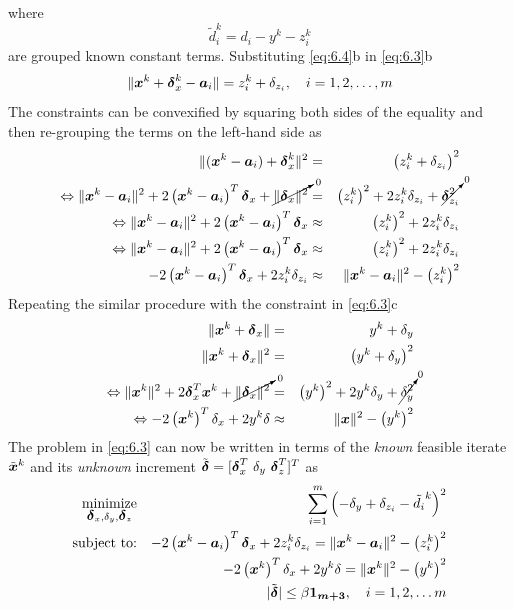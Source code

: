 where 
\begin{equation}
\nonumber
\tilde{d}^k_i =  d_i - y^k - z_i^k
\end{equation}
 are grouped known constant terms.
Substituting \ref{eq:6.4}b in \ref{eq:6.3}b
\begin{equation}
\nonumber
\|\mbox{\boldmath$x$}^k + \mbox{\boldmath${\delta}$}^k_x - \mbox{\boldmath$a$}_i\| = z^k_i +\delta_{z_i}, \quad i = 1, 2, \ldots, m
\end{equation}
The constraints can be convexified by squaring both sides of the equality and then re-grouping the terms on the left-hand side as
\begin{eqnarray}
\nonumber
\|(\mbox{\boldmath$x$}^k  - \mbox{\boldmath$a$}_i) + \mbox{\boldmath${\delta}$}^k_x\|^2 & = & \left(z^k_i +\delta_{z_i}\right)^2 \\
\nonumber
\Leftrightarrow 
\|\mbox{\boldmath$x$}^k  - \mbox{\boldmath$a$}_i\|^2 + 2\left( \mbox{\boldmath$x$}^k  - \mbox{\boldmath$a$}_i \right)^T\mbox{\boldmath${\delta}$}_x + \cancelto{\mbox{\scriptsize{0}}}{\|\mbox{\boldmath${\delta}$}_x\|^2}  & = & \left(z_i^k\right)^2 + 2z_i^k\delta_{z_i} + \cancelto{\mbox{\scriptsize{0}}}{\mbox{\boldmath${\delta}$}^2_{z_i}} \\
\nonumber
\Leftrightarrow \|\mbox{\boldmath$x$}^k  - \mbox{\boldmath$a$}_i\|^2 + 2\left( \mbox{\boldmath$x$}^k  - \mbox{\boldmath$a$}_i \right)^T\mbox{\boldmath${\delta}$}_x   & \approx & \left(z_i^k\right)^2 + 2z_i^k\delta_{z_i} \\
\nonumber
\Leftrightarrow \|\mbox{\boldmath$x$}^k  - \mbox{\boldmath$a$}_i\|^2 + 2\left( \mbox{\boldmath$x$}^k  - \mbox{\boldmath$a$}_i \right)^T\mbox{\boldmath${\delta}$}_x   & \approx & \left(z_i^k\right)^2 + 2z_i^k\delta_{z_i} \\
\nonumber
- 2\left( \mbox{\boldmath$x$}^k  - \mbox{\boldmath$a$}_i \right)^T\mbox{\boldmath${\delta}$}_x + 2z_i^k\delta_{z_i}  & \approx & \|\mbox{\boldmath$x$}^k  - \mbox{\boldmath$a$}_i\|^2 - \left(z_i^k\right)^2
\end{eqnarray}
Repeating the similar procedure with the constraint in \ref{eq:6.3}c
\begin{eqnarray}
\nonumber
\|\mbox{\boldmath$x$}^k + \mbox{\boldmath${\delta}$}_x\| & = & y^k + \delta_y \\
\nonumber
\|\mbox{\boldmath$x$}^k + \mbox{\boldmath${\delta}$}_x\|^2 & = & \left(y^k + \delta_y \right)^2 \\
\nonumber
\Leftrightarrow \|\mbox{\boldmath$x$}^k\|^2 + 2\mbox{\boldmath${\delta}$}_x^T\mbox{\boldmath$x$}^k + \cancelto{\mbox{\scriptsize{0}}}{\|\mbox{\boldmath${\delta}$}_x\|^2} & = & \left(y^k\right)^2 + 2y^k\delta_y +  \cancelto{\mbox{\scriptsize{0}}}{\delta_y^2} \\
\nonumber
\Leftrightarrow -2\left(\mbox{\boldmath$x$}^k\right)^T\delta_x + 2y^k\delta & \approx & \|\mbox{\boldmath$x$}\|^2 - \left(y^k\right)^2
\end{eqnarray}
The problem in \ref{eq:6.3} can now be written in terms of the \textit{known} feasible  iterate $\tilde{\mbox{\boldmath$x$}}^k$ and its \textit{unknown} increment  $\tilde{\mbox{\boldmath${\delta}$}} = [\mbox{\boldmath${\delta}$}_x^T \  \delta_y \ \mbox{\boldmath${\delta}$}_{z}^T]^T$ as
\begin{eqnarray} \label{eq:6.6}
\mathop{\mbox{minimize}}_{\mbox{\boldmath${\delta}$}_x, \delta_y, \mbox{\boldmath${\delta}$}_z}& &\sum^m_{i=1}\left( -\delta_y + \delta_{z_i} -\tilde{d_i}^k\right)^2\\
\nonumber
\mbox{subject to:}& &- 2\left( \mbox{\boldmath$x$}^k  - \mbox{\boldmath$a$}_i \right)^T\mbox{\boldmath${\delta}$}_x + 2z_i^k\delta_{z_i}  = \|\mbox{\boldmath$x$}^k  - \mbox{\boldmath$a$}_i\|^2 - \left(z_i^k\right)^2 \\
\nonumber
& &-2\left(\mbox{\boldmath$x$}^k\right)^T\delta_x + 2y^k\delta = \|\mbox{\boldmath$x$}^k\|^2 - \left(y^k\right)^2 \\
\nonumber
& &|{\tilde{\mbox{\boldmath${\delta}$}}}|  \leq \beta\mbox{\boldmath${1_{m+3}}$}, \quad  i = 1, 2, \ldots m
\end{eqnarray}
